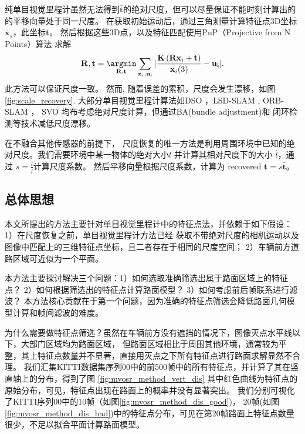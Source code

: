 纯单目视觉里程计虽然无法得到$\mathbf{\bar{t}}$的绝对尺度，但可以尽量保证不能时刻计算出的的平移向量处于同一尺度。
在获取初始运动后，通过三角测量计算特征点3D坐标$\mathbf{\bar{x}}_s$，此坐标$\mathbf{\bar{t}}$。
然后根据这些3D点，以及特征匹配使用PnP（Projective from N Points）算法 \cite{lepetit2009epnp} 求解 
\begin{equation}
    \mathbf{R,t}=\mathop{\argmin}_{\mathbf{R,t}}\sum_{\mathbf{x}_i,\mathbf{u}_i}|\frac{\mathbf{K}\left(\mathbf{R}\mathbf{x}_i+\mathbf{t}\right)}{\mathbf{x}_i(3)}-\mathbf{u_i}|.
\end{equation}
此方法可以保证尺度一致。 然而, 随着误差的累积，尺度会发生漂移，如图\ref{fig:scale_recovery}. 
大部分单目视觉里程计算法如DSO \cite{engel2016dso}，LSD-SLAM \cite{engel2014lsd},
ORB-SLAM \cite{raul2015orb}， SVO \cite{forster2014svo}均布考虑绝对尺度计算，但通过BA(bundle adjustment)和
闭环检测等技术减低尺度漂移。

在不融合其他传感器的前提下， 尺度恢复的唯一方法是利用周围环境中已知的绝对尺度。我们需要环境中某一物体的绝对大小$l$ 
并计算其相对尺度下的大小 $\bar{l}$，通过 $s = \frac{l}{\bar{l}}$计算尺度系数。 然后平移向量根据尺度系数，计算为
recovered $\mathbf{t} = s\mathbf{\bar{t}}$。
\subsection{总体思想}
本文所提出的方法主要针对单目视觉里程计中的特征点法，并依赖于如下假设：
1）在尺度恢复之前，单目视觉里程计方法已经
获取不带绝对尺度的相机运动以及图像中匹配上的三维特征点坐标，且二者存在于相同的尺度空间；
2）车辆前方道路区域可近似为一个平面。

本方法主要探讨解决三个问题：1）如何选取准确筛选出属于路面区域上的特征点？
2）如何根据筛选出的特征点计算路面模型？
3）如何考虑前后帧联系进行滤波？
本方法核心贡献在于第一个问题，因为准确的特征点筛选会降低路面几何模型计算和帧间滤波的难度。

为什么需要做特征点筛选？虽然在车辆前方没有遮挡的情况下，图像灭点水平线以下，大部门区域均为路面区域，
但路面区域相比于周围其他环境，通常较为平整，其上特征点数量并不显著，直接用灭点之下所有特征点进行路面求解显然不合理。
我们汇集KITTI数据集序列00中的前500帧中的所有特征点，并计算了其在竖直轴上的分布，得到了图 \ref{fig:mvosr_method_vert_dis}
其中红色曲线为特征点的原始分布，可见，特征点出现在路面上的概率并没有显著突出。
我们分别可视化了KITTI序列00中的10帧（如图\ref{fig:mvosr_method_dis_good})，
20帧(如图 \ref{fig:mvosr_method_dis_bad})中的特征点分布，可见在第20帧路面上特征点数量很少，不足以拟合平面计算路面模型。


